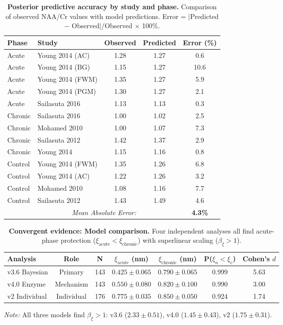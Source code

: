 \documentclass[10pt,a4paper]{article}
\begin{document}
\begin{table}[htbp]
\centering
\caption{\textbf{Posterior predictive accuracy by study and phase.} Comparison of observed NAA/Cr values with model predictions. Error = $|$Predicted $-$ Observed$|$/Observed $\times$ 100\%.}
\label{tab:predictions}
\begin{tabular}{llccc}
\toprule
\textbf{Phase} & \textbf{Study} & \textbf{Observed} & \textbf{Predicted} & \textbf{Error (\%)} \\
\midrule
Acute & Young 2014 (AC) & 1.28 & 1.27 & 0.6 \\
Acute & Young 2014 (BG) & 1.15 & 1.27 & 10.6 \\
Acute & Young 2014 (FWM) & 1.35 & 1.27 & 5.9 \\
Acute & Young 2014 (PGM) & 1.30 & 1.27 & 2.1 \\
Acute & Sailasuta 2016 & 1.13 & 1.13 & 0.3 \\
\midrule
Chronic & Sailasuta 2016 & 1.00 & 1.02 & 2.5 \\
Chronic & Mohamed 2010 & 1.00 & 1.07 & 7.3 \\
Chronic & Sailasuta 2012 & 1.42 & 1.37 & 2.9 \\
Chronic & Young 2014 & 1.15 & 1.16 & 0.8 \\
\midrule
Control & Young 2014 (FWM) & 1.35 & 1.26 & 6.8 \\
Control & Young 2014 (AC) & 1.22 & 1.26 & 3.2 \\
Control & Mohamed 2010 & 1.08 & 1.16 & 7.7 \\
Control & Sailasuta 2012 & 1.43 & 1.49 & 4.6 \\
\midrule
\multicolumn{3}{r}{\textit{Mean Absolute Error:}} & & \textbf{4.3\%} \\
\bottomrule
\end{tabular}
\end{table}

\begin{table}[htbp]
\centering
\caption{\textbf{Convergent evidence: Model comparison.} Four independent analyses all find acute-phase protection ($\xi_{\text{acute}} < \xi_{\text{chronic}}$) with superlinear scaling ($\beta_\xi > 1$).}
\label{tab:convergent_models}
\begin{tabular}{lcccccc}
\toprule
\textbf{Analysis} & \textbf{Role} & \textbf{N} & \textbf{$\xi_{\text{acute}}$ (nm)} & \textbf{$\xi_{\text{chronic}}$ (nm)} & \textbf{P($\xi_a < \xi_c$)} & \textbf{Cohen's $d$} \\
\midrule
v3.6 Bayesian & Primary & 143 & $0.425 \pm 0.065$ & $0.790 \pm 0.065$ & 0.999 & 5.63 \\
v4.0 Enzyme & Mechanism & 143 & $0.550 \pm 0.080$ & $0.820 \pm 0.100$ & 0.990 & 3.00 \\
v2 Individual & Individual & 176 & $0.775 \pm 0.035$ & $0.850 \pm 0.050$ & 0.924 & 1.74 \\
\bottomrule
\end{tabular}
\smallskip

\noindent\textit{Note:} All three models find $\beta_\xi > 1$: v3.6 ($2.33 \pm 0.51$), v4.0 ($1.45 \pm 0.43$), v2 ($1.75 \pm 0.31$).
\end{table}
\end{document}
